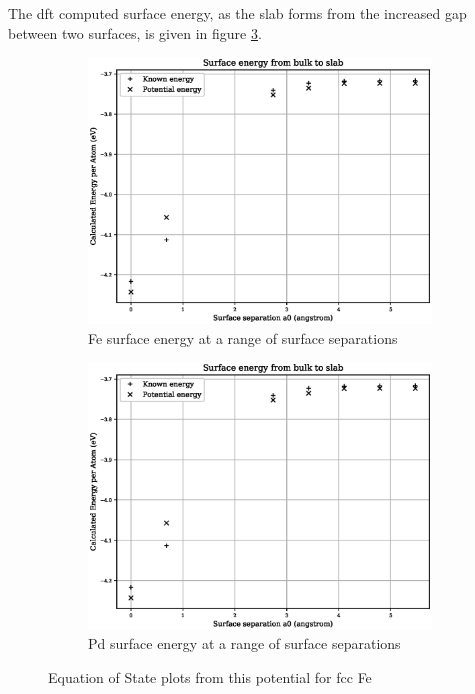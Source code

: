 The \acrshort{dft} computed surface energy, as the slab forms from the increased gap between two surfaces, is given in figure \ref{fig:fepd-energy-fitting}.

\begin{figure}[htb]
\begin{subfigure}{.42\textwidth}
  \centering
  \includegraphics[width=.94\linewidth]{chapters/potentials_fe_pd_ru/fepd_potential/fe_surface_energy.eps}  
  \caption{Fe surface energy at a range of surface separations}
  \label{fig:fepd-fefcc-rose}
\end{subfigure}
\begin{subfigure}{.42\textwidth}
  \centering
  \includegraphics[width=.94\linewidth]{chapters/potentials_fe_pd_ru/fepd_potential/pd_surface_energy.eps}  
  \caption{Pd surface energy at a range of surface separations}
  \label{fig:fepd-fefcc-bmeos}
\end{subfigure}
\label{fig:fepd-energy-fitting}
\caption{Equation of State plots from this potential for \acrshort{fcc} Fe}
\end{figure}












